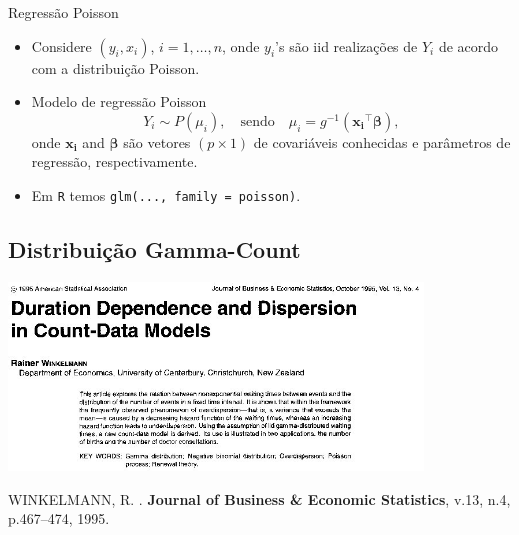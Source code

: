 \documentclass[10pt, aspectratio=169]{beamer}\usepackage[]{graphicx}\usepackage[]{color}
\begin{document}
\begin{frame}{Regressão Poisson}
\begin{itemize}
\item Considere $(y_i, x_i)$, $i = 1,\ldots, n$, onde $y_i$'s são iid 
realizações de $Y_i$ de acordo com a distribuição Poisson.
\vspace{0,5cm}
\item Modelo de regressão Poisson
$$Y_i \sim P(\mu_i), \quad  \text{sendo} \quad \mu_i = g^{-1}(\boldsymbol{x_i}^{\top} \boldsymbol{\beta}),$$
onde $\boldsymbol{x_i}$ and $\boldsymbol{\beta}$ são vetores $(p \times 1)$
de covariáveis conhecidas e parâmetros de regressão, respectivamente.
\vspace{0,5cm}
\item Em \texttt{R} temos \texttt{glm(..., family = poisson)}.
\end{itemize}
\end{frame}

\subsection{Distribuição Gamma-Count}

\begin{frame}
  \begin{center}
    \includegraphics[width=11cm]{images/winkelman95.jpeg}
  \end{center}
  \begin{thebibliography}{99}
    \MakeUppercase{Winkelmann, R.}
    .
    \textbf{Journal of Business \& Economic Statistics}, v.13, n.4,
    p.467--474, 1995.
  \end{thebibliography}
\end{frame}
\end{document}
